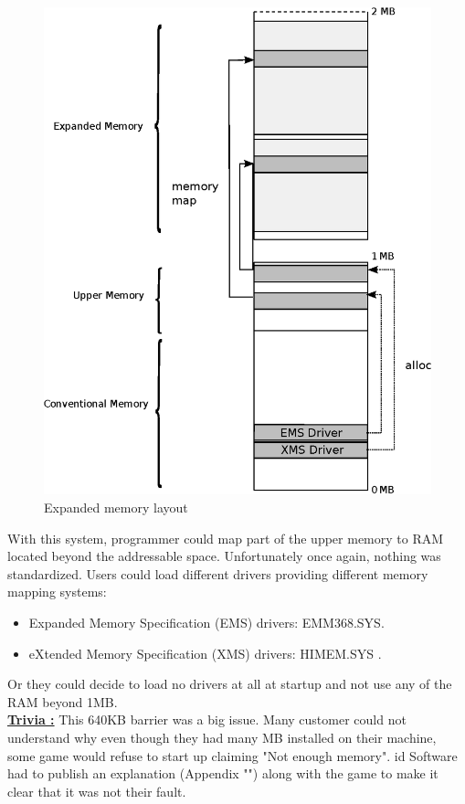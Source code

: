 \documentclass[book.tex]{subfiles}
\begin{document}
\begin{figure}[H]
\centering
\includegraphics[scale=1]{imgs/expanded_ram.eps}
\caption{Expanded memory layout}
\label{fig:ems_xms_layout}
\end{figure}
With this system, programmer could map part of the upper memory to RAM located beyond the addressable space.
Unfortunately once again, nothing was standardized. Users could load different drivers providing different memory mapping systems:
\begin{itemize}
\item Expanded Memory Specification (EMS) drivers: EMM368.SYS.
\item eXtended Memory Specification (XMS) drivers: HIMEM.SYS .
\end{itemize}

Or they could decide to load no drivers at all at startup and not use any of the RAM beyond 1MB.\\
\textbf{\underline{Trivia :}}  This 640KB barrier was a big issue. Many customer could not understand why even though they had many MB installed on their machine, some game would refuse to start up claiming "Not enough memory". id Software had to publish an explanation (Appendix "") along with the game to make it clear that it was not their fault.\\
\end{document}
